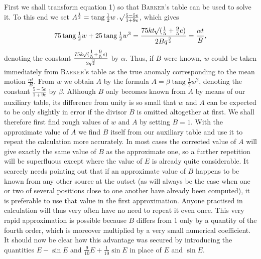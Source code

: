 First we shall transform equation 1) so that \textsc{Barker}'s table can be used to solve it. To this end we set $A^{\frac{1}{2}}=\operatorname{tang}\tfrac{1}{2}w\,\mathord{.}\,\mathord{{}^{}\!\surd}\frac{5-5e}{1+9e}$, which gives
\[
75\operatorname{tang}\tfrac{1}{2}w+25\operatorname{tang}\tfrac{1}{2}w^3=\frac{75kt\mathord{{}^{}\!\surd}(\tfrac{1}{5}+\tfrac{9}{5}e)}{2Bq^{\frac{3}{2}}}=\frac{\alpha t}{B},
\]
denoting the constant $\frac{75k\mathord{{}^{}\!\surd}(\tfrac{1}{5}+\tfrac{9}{5}e)}{2q^{\frac{3}{2}}}$ by $\alpha$\HistoricalNoteEight{Manuscript note:] If \textsc{Burckhardt}'s table is used [Connaissance des Temps 1818, see also vol. VI, p. 596], then $\frac{\BareRoot{(\tfrac{1}{10}+\tfrac{9}{10}e)}}{q^{\frac{3}{2}}}=\alpha$.}. Thus, if $B$ were known, $w$ could be taken immediately from \textsc{Barker}'s table as the true anomaly corresponding to the mean motion $\frac{\alpha t}{B}$. From $w$ we obtain $A$ by the formula $A=\beta\operatorname{tang}\tfrac{1}{2}w^2$, denoting the constant $\frac{5-5e}{1+9e}$ by $\beta$. Although $B$ only becomes known from $A$ by means of our auxiliary table, its difference from unity is so small that $w$ and $A$ can be expected to be only slightly in error if the divisor $B$ is omitted altogether at first. We shall therefore first find rough values of $w$ and $A$ by setting $B=1$. With the approximate value of $A$ we find $B$ itself from our auxiliary table and use it to repeat the calculation more accurately. In most cases the corrected value of $A$ will give exactly the same value of $B$ as the approximate one, so a further repetition will be superfluous except where the value of $E$ is already quite considerable. It scarcely needs pointing out that if an approximate value of $B$ happens to be known from any other source at the outset (as will always be the case when one or two of several positions close to one another have already been computed), it is preferable to use that value in the first approximation. Anyone practised in calculation will thus very often have no need to repeat it even once. This very rapid approximation is possible because $B$ differs from $1$ only by a quantity of the fourth order, which is moreover multiplied by a very small numerical coefficient. It should now be clear how this advantage was secured by introducing the quantities $E-\sin E$ and $\tfrac{9}{10}E+\tfrac{1}{10}\sin E$ in place of $E$ and $\sin E$.
